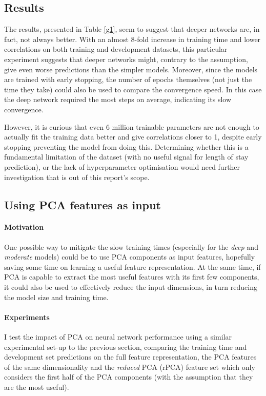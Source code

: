 \documentclass[10pt, twocolumn]{article}
\begin{document}
\subsection{Results}
The results, presented in Table \ref{g1}, seem to suggest that deeper networks are, in fact, not always better. With an almost 8-fold increase in training time and lower correlations on both training and development datasets, this particular experiment suggests that deeper networks might, contrary to the assumption, give even worse predictions than the simpler models. Moreover, since the models are trained with early stopping, the number of epochs themselves (not just the time they take) could also be used to compare the convergence speed. In this case the deep network required the most steps on average, indicating its slow convergence.

However, it is curious that even 6 million trainable parameters are not enough to actually fit the training data better and give correlations closer to 1, despite early stopping preventing the model from doing this. Determining whether this is a fundamental limitation of the dataset (with no useful signal for length of stay prediction), or the lack of hyperparameter optimisation would need further investigation that is out of this report's scope.

\subsection{Using PCA features as input}
\paragraph{Motivation} One possible way to mitigate the slow training times (especially for the \textit{deep} and \textit{moderate} models) could be to use PCA components as input features, hopefully saving some time on learning a useful feature representation. At the same time, if PCA is capable to extract the most useful features with its first few components, it could also be used to effectively reduce the input dimensions, in turn reducing the model size and training time. 

\paragraph{Experiments} I test the impact of PCA on neural network performance using a similar experimental set-up to the previous section, comparing the training time and development set predictions on the full feature representation, the PCA features of the same dimensionality and the \textit{reduced} PCA (rPCA) feature set which only considers the first half of the PCA components (with the assumption that they are the most useful).
\end{document}
